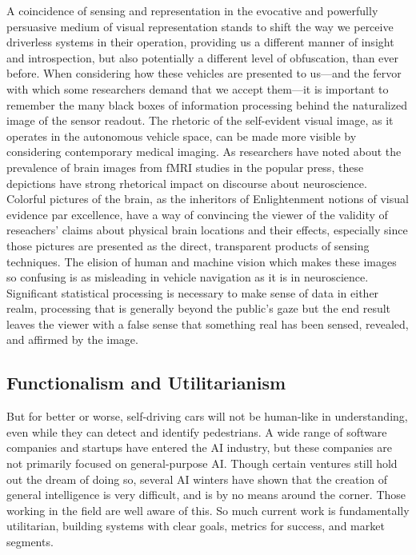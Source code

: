 A coincidence of sensing and representation in the evocative and
powerfully persuasive medium of visual representation stands to shift
the way we perceive driverless systems in their operation, providing
us a different manner of insight and introspection, but also
potentially a different level of obfuscation, than ever before. When
considering how these vehicles are presented to us—and the fervor with
which some researchers demand that we accept them\cite{???}---it is important to
remember the many black boxes of information processing behind the
naturalized image of the sensor readout. The rhetoric of the
self-evident visual image, as it operates in the autonomous vehicle
space, can be made more visible by considering contemporary medical
imaging. As researchers have noted about the prevalence of brain
images from fMRI studies in the popular press, these depictions have
strong rhetorical impact on discourse about neuroscience. Colorful
pictures of the brain, as the inheritors of Enlightenment notions of
visual evidence par excellence, have a way of convincing the viewer of
the validity of reseachers' claims about physical brain locations and
their effects,\cite{???} especially since those pictures are presented as the
direct, transparent products of sensing techniques. The elision of
human and machine vision which makes these images so confusing is as
misleading in vehicle navigation as it is in neuroscience. Significant
statistical processing is necessary to make sense of data in either
realm, processing that is generally beyond the public's gaze\cite{???} but the
end result leaves the viewer with a false sense that something real
has been sensed, revealed, and affirmed by the image.


\subsection{Functionalism and Utilitarianism} 
But for better or worse, self-driving cars will not be human-like in
understanding, even while they can detect and identify pedestrians.
A wide range of software companies and startups have entered the AI
industry, but these companies are not primarily focused on
general-purpose AI. Though certain ventures still hold out the dream
of doing so, several AI winters have shown that the creation of
general intelligence is very difficult, and is by no means around the
corner. Those working in the field are well aware of
this.\cite{???-articlerebuttingmusk} So much current work is
fundamentally utilitarian, building systems with clear goals, metrics
for success, and market segments.

